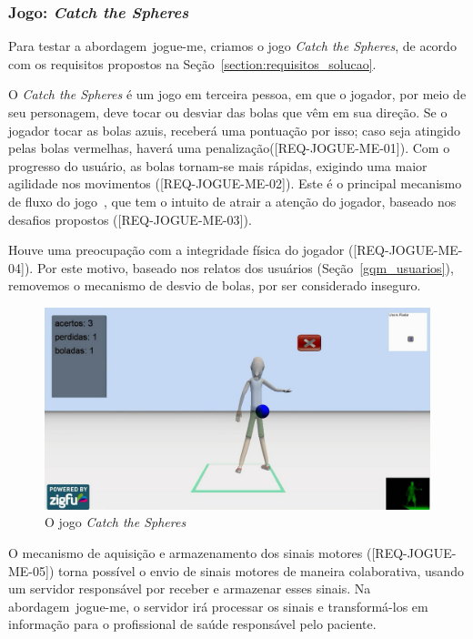 \subsubsection{Jogo: \textit{Catch the Spheres}}\label{jogo_catch}
Para testar a abordagem~\ac{jogue-me}, criamos o jogo \textit{Catch the Spheres}, de acordo com os requisitos propostos na Seção~\ref{section:requisitos_solucao}.  

O \textit{Catch the Spheres} é um jogo em terceira pessoa, em que o jogador, por meio de seu personagem, deve tocar ou desviar das bolas que vêm em sua direção. Se o jogador tocar as bolas azuis, receberá uma pontuação por isso; caso seja atingido pelas bolas vermelhas, haverá uma penalização([REQ-JOGUE-ME-01]). Com o progresso do usuário, as bolas tornam-se mais rápidas, exigindo uma maior agilidade nos movimentos ([REQ-JOGUE-ME-02]). Este é o principal mecanismo de fluxo do jogo~\cite{sweetser2005-gameflow}, que tem o intuito de atrair a atenção do jogador, baseado nos desafios propostos ([REQ-JOGUE-ME-03]). 

Houve uma preocupação com a integridade física do jogador ([REQ-JOGUE-ME-04]). Por este motivo, baseado nos relatos dos usuários (Seção~\ref{gqm_usuarios}), removemos o mecanismo de desvio de bolas, por ser considerado inseguro.

\begin{figure}[!htb]
     \centering
     \includegraphics[width=.8\textwidth]{./img/catch-the-spheres.png}
     \caption{O jogo \emph{Catch the Spheres}}
     \label{img:catch}
\end{figure}

O mecanismo de aquisição e armazenamento dos sinais motores ([REQ-JOGUE-ME-05]) torna possível o envio de sinais motores de maneira colaborativa, usando um servidor responsável por receber e armazenar esses sinais. Na abordagem~\ac{jogue-me}, o servidor irá processar os sinais e transformá-los em informação para o profissional de saúde responsável pelo paciente.

